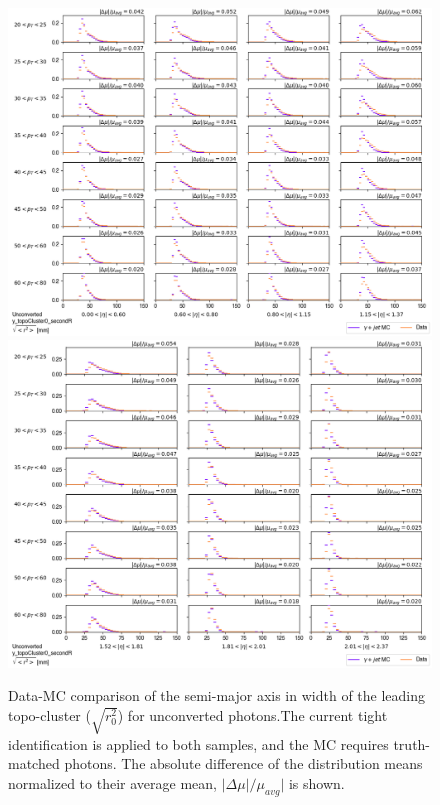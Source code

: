\begin{figure}[!thp]
    \centering
    \includegraphics[width=.74\textwidth]{chapters/chapter4_photonID/images/y_topoCluster0_secondR_Unconverted_lowerEta.png}
    \includegraphics[width=.74\textwidth]{chapters/chapter4_photonID/images/y_topoCluster0_secondR_Unconverted_upperEta.png}
    \caption[Data-MC comparison of the semi-major axis in width of the leading topo-cluster ($\sqrt{r_0^2}$) for unconverted photons]{Data-MC comparison of the semi-major axis in width of the leading topo-cluster ($\sqrt{r_0^2}$) for unconverted photons.The current tight identification is applied to both samples, and the \gls{MC} requires truth-matched photons. The absolute difference of the distribution means normalized to their average mean, $|\Delta \mu|/\mu_{avg}|$ is shown.}
    \label{fig:data-mc-secondR}
\end{figure}

